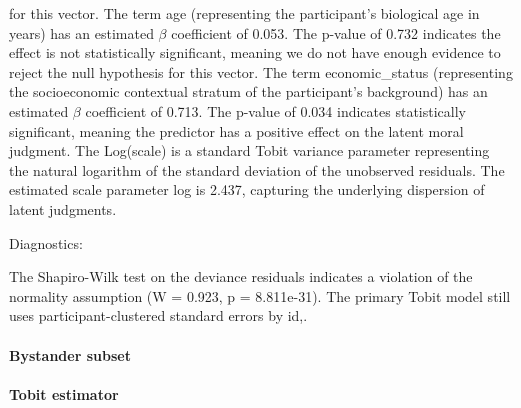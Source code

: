 \documentclass[11pt]{article}
\begin{document}
for this vector. The term age (representing the participant's biological age in years) has an estimated $\beta$ coefficient of 0.053. The p-value of 0.732 indicates the effect is not statistically significant, meaning we do not have enough evidence to reject the null hypothesis for this vector. The term economic\_status (representing the socioeconomic contextual stratum of the participant's background) has an estimated $\beta$ coefficient of 0.713. The p-value of 0.034 indicates statistically significant, meaning the predictor has a positive effect on the latent moral judgment. The Log(scale) is a standard Tobit variance parameter representing the natural logarithm of the standard deviation of the unobserved residuals. The estimated scale parameter log is 2.437, capturing the underlying dispersion of latent judgments.

Diagnostics:

The Shapiro-Wilk test on the deviance residuals indicates a violation of the normality assumption (W = 0.923, p = 8.811e-31). The primary Tobit model still uses participant-clustered standard errors by id,.


\paragraph{Bystander subset}

\paragraph{Tobit estimator}
\end{document}
